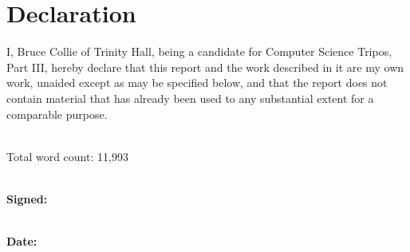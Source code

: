 \section*{Declaration}

I, Bruce Collie of Trinity Hall, being a candidate for Computer Science Tripos,
Part III, hereby declare that this report and the work described in it are my
own work, unaided except as may be specified below, and that the report does not
contain material that has already been used to any substantial extent for a
comparable purpose.

\vspace{0.75cm}

\noindent
\\Total word count: 11,993

\vspace{0.75cm}

\noindent
\\\textbf{Signed:}

\vspace{0.75cm}

\noindent
\\\textbf{Date:}

